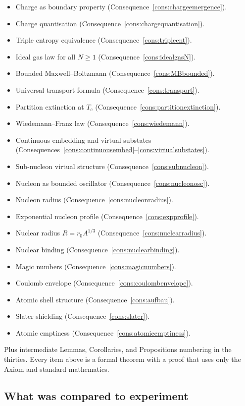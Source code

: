 \documentclass[11pt,twocolumn,a4paper]{article}
\theoremstyle{axiomstyle}
\theoremstyle{conseqstyle}
\theoremstyle{definition}
\theoremstyle{remark}
\begin{document}
\begin{itemize}
\item Charge as boundary property (Consequence~\ref{cons:chargeemergence}).
\item Charge quantisation (Consequence~\ref{cons:chargequantisation}).
\item Triple entropy equivalence (Consequence~\ref{cons:tripleent}).
\item Ideal gas law for all $N\ge 1$ (Consequence~\ref{cons:idealgasN}).
\item Bounded Maxwell--Boltzmann (Consequence~\ref{cons:MBbounded}).
\item Universal transport formula (Consequence~\ref{cons:transport}).
\item Partition extinction at $T_{c}$ (Consequence~\ref{cons:partitionextinction}).
\item Wiedemann--Franz law (Consequence~\ref{cons:wiedemann}).
\item Continuous embedding and virtual substates (Consequences~\ref{cons:continuousembed}--\ref{cons:virtualsubstates}).
\item Sub-nucleon virtual structure (Consequence~\ref{cons:subnucleon}).
\item Nucleon as bounded oscillator (Consequence~\ref{cons:nucleonosc}).
\item Nucleon radius (Consequence~\ref{cons:nucleonradius}).
\item Exponential nucleon profile (Consequence~\ref{cons:expprofile}).
\item Nuclear radius $R=r_{0}A^{1/3}$ (Consequence~\ref{cons:nuclearradius}).
\item Nuclear binding (Consequence~\ref{cons:nuclearbinding}).
\item Magic numbers (Consequence~\ref{cons:magicnumbers}).
\item Coulomb envelope (Consequence~\ref{cons:coulombenvelope}).
\item Atomic shell structure (Consequence~\ref{cons:aufbau}).
\item Slater shielding (Consequence~\ref{cons:slater}).
\item Atomic emptiness (Consequence~\ref{cons:atomicemptiness}).
\end{itemize}

Plus intermediate Lemmas, Corollaries, and Propositions numbering in the thirties. Every item above is a formal theorem with a proof that uses only the Axiom and standard mathematics.

\subsection{What was compared to experiment}
\end{document}
